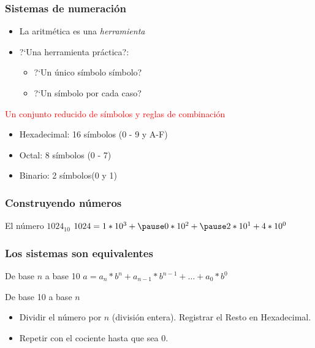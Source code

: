 \begin{frame}
    \frametitle{Sistemas de numeraci\'on}
    \begin{itemize}
        \item La aritm\'etica es una \emph{herramienta}\pause
        \item ?`Una herramienta pr\'actica?:
            \begin{itemize}
                \item ?`Un \'unico s\'imbolo s\'imbolo? \pause
                \item ?`Un s\'imbolo por cada caso? \pause
            \end{itemize}
    \end{itemize}
    \textcolor{red}{Un conjunto reducido de s\'imbolos y reglas de combinaci\'on}
    \begin{itemize}
        \item Hexadecimal: 16 s\'imbolos (0 - 9 y A-F)
        \item Octal: 8 s\'imbolos (0 - 7)
        \item Binario: 2 s\'imbolos(0 y 1)
    \end{itemize}
\end{frame}

\begin{frame}
    \frametitle{Construyendo n\'umeros}
    \begin{block}{El n\'umero $1024_{10}$}
        $1024 = 1*10^3 + \pause 0*10^2 + \pause 2*10^1 +  4*10^0 $
    \end{block}
\end{frame}


\begin{frame}
    \frametitle{Los sistemas son equivalentes}
    \begin{block}{De base $n$ a base 10}
        $a = a_{n}*b^n + a_{n-1}*b^{n-1} + \ldots + a_{0} * b^{0}$
    \end{block}
    \pause
    \begin{block}{De base 10 a base $n$}
        \begin{itemize}
            \item Dividir el n\'umero por $n$ (divisi\'on entera). Registrar el Resto en Hexadecimal.
            \item Repetir con el cociente hasta que sea $0$.
        \end{itemize}
    \end{block}
\end{frame}

